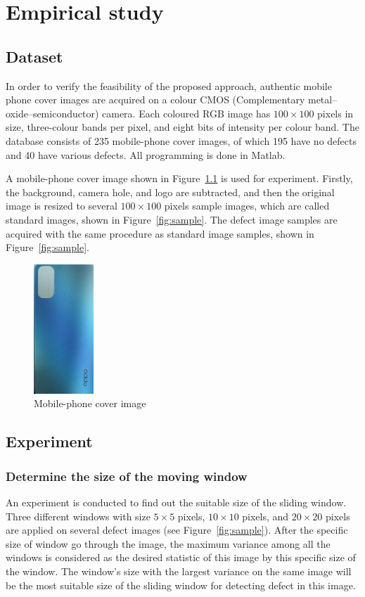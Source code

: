 \chapter{Empirical study}
\label{cp:dataset and experiment}
\section{Dataset}
In order to verify the feasibility of the proposed approach, authentic mobile phone cover images are acquired on a colour CMOS (Complementary metal–oxide–semiconductor) camera. Each coloured RGB image has $100 \times 100$ pixels in size, three-colour bands per pixel, and eight bits of intensity per colour band. The database consists of 235 mobile-phone cover images, of which 195 have no defects and 40 have various defects. All programming is done in Matlab.

A mobile-phone cover image shown in Figure~\ref{fig:handy-cover} is used for experiment. Firstly, the background, camera hole, and logo are subtracted, and then the original image is resized to several $100 \times 100$ pixels sample images, which are called standard images, shown in Figure~\ref{fig:sample}. The defect image samples are acquired with the same procedure as standard image samples, shown in Figure~\ref{fig:sample}.



\begin{figure}[h]
\centering
\includegraphics[width=0.2\textwidth]{images/original1.png}
\caption{Mobile-phone cover image}
\label{fig:handy-cover}
\end{figure}

\section{Experiment}
\subsection{Determine the size of the moving window}
An experiment is conducted to find out the suitable size of the sliding window. Three different windows with size $5 \times 5$ pixels, $10 \times 10$ pixels, and $20 \times 20$ pixels are applied on several defect images (see Figure~\ref{fig:sample}). After the specific size of window go through the image, the maximum variance among all the windows is considered as the desired statistic of this image by this specific size of the window. The window's size with the largest variance on the same image will be the most suitable size of the sliding window for detecting defect in this image. 

